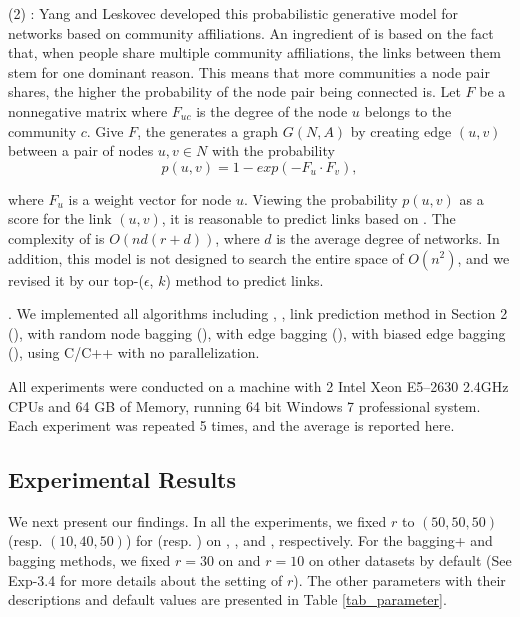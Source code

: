   \noindent (2) \CAMBN \cite{yang-wsdm2013}:
  Yang and Leskovec developed this probabilistic generative model for networks
  based on community affiliations. An ingredient of \BIGCLAM is based on the fact that,
  when people share multiple community affiliations, the links between them stem for
  one dominant reason. This means that more communities a node pair shares,
  the higher the probability of the  node pair being connected is.
  Let $F$ be a nonnegative matrix where $F_{uc}$ is the degree of the node $u$ belongs to
  the community $c$. Give $F$, the \BIGCLAM generates a graph $G(N, A)$ by creating edge
  $(u, v)$ between a pair of nodes $u, v \in N$ with the probability
    \[ p(u, v) = 1 - exp(-F_u\cdot F_v), \]

\noindent  where $F_u$ is a weight vector for node $u$. Viewing the probability $p(u, v)$ as
  a score for the link $(u, v)$, it is reasonable to predict links based on \BIGCLAM.
The complexity of  \BIGCLAM is $O(nd(r + d) )$, where $d$ is the average degree of networks.
  In addition, this model is not designed to search the entire space of $O( n^2 )$,
  and we revised it by our top-($\epsilon$, $k$) method to predict links.


.
We implemented all algorithms including \Aa, \BIGCLAM, 
link prediction method in Section 2 (\NMF),
\NMF with random node bagging (\Node), \NMF with  edge bagging (\Edge),
\NMF with biased edge bagging (\Biased),
using C/C++ with no parallelization.


All experiments were conducted on a machine with 2 Intel Xeon
E5--2630 2.4GHz CPUs and 64 GB of Memory, running 64 bit
Windows 7 professional system. Each experiment was repeated 5 times,
and the average is reported here.


\subsection{Experimental Results}


We next present our findings. In all the experiments, we fixed $r$ to
$(50, 50, 50)$ (resp. $(10, 40, 50)$) for \NMF (resp. \BIGCLAM) on
\Digg, \YouTube, and \Wikipedia, respectively. For the bagging+ and bagging
methods, we fixed $r = 30$ on \Digg and $r = 10$ on other datasets by default
(See Exp-3.4 for more details about the setting of $r$). 
The other parameters with their descriptions and default values
are presented in Table \ref{tab_parameter}.





